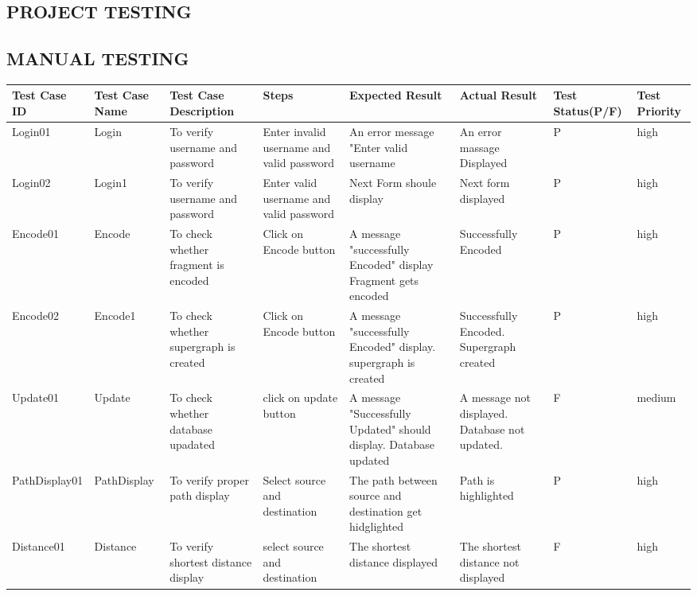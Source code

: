 \begin{center}

\justifying
\chapter{\large PROJECT TESTING}

\justifying
\section{\normalsize MANUAL TESTING}
\tabletail{%
	\hline}

		\begin{supertabular}{| p{1.73cm} |p{1.73cm}| p{1.73cm}| p{1.73cm} | p{1.73cm} | p{1.73cm} | p{1.73cm} | p{1.73cm} |}
		 \hline
  \textbf{Test Case ID}  &	\textbf{Test Case Name} &	\textbf{Test Case Description} &	\textbf{Steps} & \textbf{Expected Result} & \textbf{Actual Result} &\textbf{Test Status(P/F)} & \textbf{Test Priority}\\ \hline
			Login01 & Login & To verify username and password & Enter invalid username and valid password & An error message "Enter valid username & An error massage Displayed & P & high \\ \hline
			Login02 & Login1 & To verify username and password & Enter valid username and valid password & Next Form shoule display & Next form displayed & P & high \\ \hline
			Encode01 & Encode & To check whether fragment is encoded & Click on Encode button &  A message "successfully Encoded" display Fragment gets encoded & Successfully Encoded & P & high \\ \hline
			Encode02 & Encode1 & To check whether supergraph is created & Click on Encode button &  A message "successfully Encoded" display. supergraph is created & Successfully Encoded. Supergraph created & P & high \\ \hline
			Update01 & Update & To check whether database upadated & click on update button & A message "Successfully Updated" should display. Database updated & A message not displayed. Database not updated. & F & medium \\ \hline
			
			PathDisplay01 & PathDisplay & To verify proper path display & Select source and destination & The path between source and destination get hidglighted & Path is highlighted & P & high \\ \hline
			Distance01 & Distance & To verify shortest distance display & select source and destination & The shortest distance displayed & The shortest distance not displayed & F & high \\ \hline
	
		\end{supertabular}
\end{center}